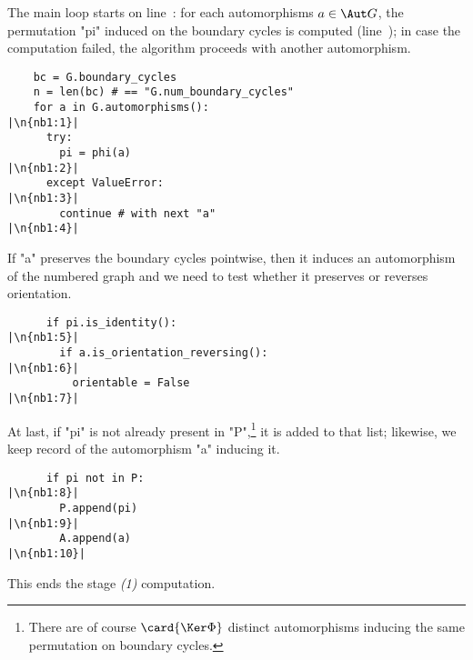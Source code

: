 The main loop starts on line~: for each automorphisms $a \in
\Aut G$, the permutation "pi" induced on the boundary cycles is
computed (line~); in case the computation failed, the
algorithm proceeds with another automorphism.
\begin{lstlisting}
    bc = G.boundary_cycles
    n = len(bc) # == "G.num_boundary_cycles"
    for a in G.automorphisms():                              |\n{nb1:1}|
      try:
        pi = phi(a)                                          |\n{nb1:2}|
      except ValueError:                                     |\n{nb1:3}|
        continue # with next "a"                             |\n{nb1:4}|

\end{lstlisting}
If "a" preserves the boundary cycles pointwise, then it induces an
automorphism of the numbered graph and we need to test whether it
preserves or reverses orientation.
\begin{lstlisting}
      if pi.is_identity():                                   |\n{nb1:5}|
        if a.is_orientation_reversing():                     |\n{nb1:6}|
          orientable = False                                 |\n{nb1:7}|

\end{lstlisting}
At last, if "pi" is not already present in "P",\footnote{There are
  of course $\card{\Ker\Phi}$ distinct automorphisms inducing the same
  permutation on boundary cycles.}  it is added to that list;
likewise, we keep record of the automorphism "a" inducing it.
\begin{lstlisting}
      if pi not in P:                                        |\n{nb1:8}|
        P.append(pi)                                         |\n{nb1:9}|
        A.append(a)                                          |\n{nb1:10}|

\end{lstlisting}
This ends the stage {\sl (1)} computation.

